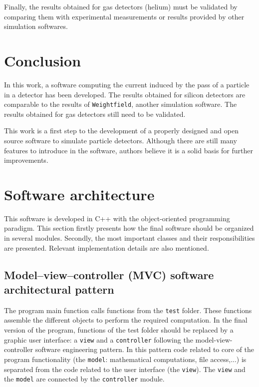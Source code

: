 \documentclass[11pt]{article}
\begin{document}
	Finally, the results obtained for gas detectors (helium) must be validated
	by comparing them with experimental measurements or results provided by other
	simulation softwares.

\section*{Conclusion}

	In this work, a software computing the current induced by the pass of a
	particle in a detector has been developed. The results obtained for silicon
	detectors are comparable to the results of \texttt{Weightfield},
	another simulation software. The results obtained for gas detectors still
	need to be validated.

	This work is a first step to the development of a properly designed and open source
	software to simulate particle detectors. Although there are still
	many features to introduce in the software, authors believe it is a solid
	basis for further improvements.

\newpage

\appendix
\section{Software architecture} \label{App:soft_arch}

	This software is developed in C++ with the object-oriented programming paradigm.
	This section firstly presents how the final software should be organized in several
	modules. Secondly, the most important classes and their responsibilities are
	presented. Relevant implementation details are also mentioned.

	\subsection{Model–view–controller (MVC) software architectural pattern}

		The program main function calls functions from the \texttt{test} folder. These functions
		assemble the different objects to perform the required computation. In the
		final version of the program, functions of the test folder should be replaced
		by a graphic user interface: a \texttt{view} and a \texttt{controller} following
		the model-view-controller software engineering pattern. In this pattern code
		related to core of the program functionality (the \texttt{model}: mathematical computations, file access,...)
		is separated from the code related to the user interface (the \texttt{view}).
		The \texttt{view} and the
		\texttt{model} are connected by the \texttt{controller} module.
\end{document}
